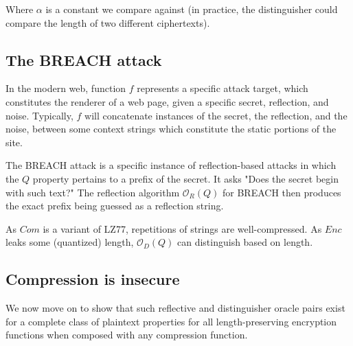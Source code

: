 \documentclass{article} \usepackage[utf8]{inputenc}
\begin{document}
Where $\alpha$ is a constant we compare against (in practice, the distinguisher
could compare the length of two different ciphertexts).

\subsection*{The BREACH attack}

In the modern web, function $f$ represents a specific attack target, which
constitutes the renderer of a web page, given a specific secret, reflection,
and noise. Typically, $f$ will concatenate instances of the secret, the
reflection, and the noise, between some context strings which constitute the
static portions of the site.

The BREACH attack is a specific instance of reflection-based attacks in which
the $Q$ property pertains to a prefix of the secret. It asks "Does the secret
begin with such text?" The reflection algorithm $\mathcal{O}_R(Q)$ for BREACH
then produces the exact prefix being guessed as a reflection string.

As $Com$ is a variant of LZ77, repetitions of strings are well-compressed. As
$Enc$ leaks some (quantized) length, $\mathcal{O}_D(Q)$ can distinguish based
on length.

\subsection*{Compression is insecure}

We now move on to show that such reflective and distinguisher oracle pairs
exist for a complete class of plaintext properties for all length-preserving
encryption functions when composed with any compression function.
\end{document}
